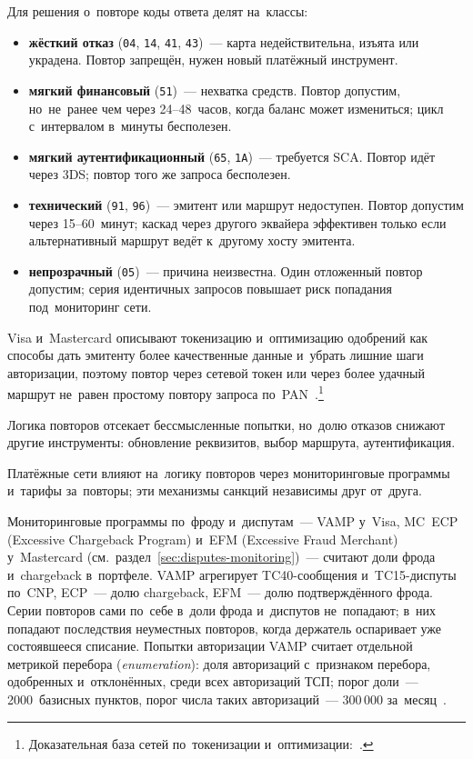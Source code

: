 Для решения о~повторе коды ответа делят на~классы:

\begin{itemize}
  \item \textbf{жёсткий отказ} (\texttt{04}, \texttt{14}, \texttt{41},
    \texttt{43})~--- карта недействительна, изъята или украдена. Повтор
    запрещён, нужен новый платёжный инструмент.
  \item \textbf{мягкий финансовый} (\texttt{51})~--- нехватка средств. Повтор
    допустим, но~не~ранее чем через 24--48~часов, когда баланс может
    измениться; цикл с~интервалом в~минуты бесполезен.
  \item \textbf{мягкий аутентификационный} (\texttt{65}, \texttt{1A})~---
    требуется SCA. Повтор идёт через 3DS; повтор того же запроса
    бесполезен.
  \item \textbf{технический} (\texttt{91}, \texttt{96})~--- эмитент или маршрут
    недоступен. Повтор допустим через 15--60~минут; каскад через другого
    эквайера эффективен только если альтернативный маршрут ведёт к~другому
    хосту эмитента.
  \item \textbf{непрозрачный} (\texttt{05})~--- причина неизвестна. Один
    отложенный повтор допустим; серия идентичных запросов повышает риск
    попадания под~мониторинг сети.
\end{itemize}

Visa и~Mastercard описывают токенизацию и~оптимизацию одобрений как способы
дать эмитенту более качественные данные и~убрать лишние шаги авторизации, поэтому
повтор через сетевой токен или через более удачный маршрут не~равен простому
повтору запроса
по~PAN~\cite{visa-vts,mc-acquirers-psps}.\footnote{Доказательная база сетей по~токенизации и~оптимизации:~\cite{visa-tokenization-security,mc-pop}.}

Логика повторов отсекает бессмысленные попытки, но~долю отказов
снижают другие инструменты: обновление реквизитов, выбор маршрута,
аутентификация.

Платёжные сети влияют на~логику повторов через мониторинговые программы
и~тарифы за~повторы; эти механизмы санкций независимы друг от~друга.

Мониторинговые программы по~фроду и~диспутам~--- VAMP у~Visa, MC~ECP (Excessive
Chargeback Program) и~EFM (Excessive Fraud Merchant) у~Mastercard
(см.~раздел~\ref{sec:disputes-monitoring})~--- считают доли фрода
и~chargeback в~портфеле. VAMP агрегирует TC40-сообщения и~TC15-диспуты
по~CNP, ECP~--- долю chargeback, EFM~--- долю подтверждённого фрода. Серии
повторов сами по~себе в~доли фрода и~диспутов не~попадают; в~них попадают
последствия неуместных повторов, когда держатель оспаривает уже состоявшееся
списание. Попытки авторизации VAMP считает отдельной метрикой перебора
(\textit{enumeration}): доля авторизаций с~признаком перебора, одобренных
и~отклонённых, среди всех авторизаций ТСП; порог доли~--- 2000~базисных
пунктов, порог числа таких авторизаций~--- 300\,000 за~месяц~\cite{visa-vamp-fact-sheet-2025,mc-compliance-programs}.

